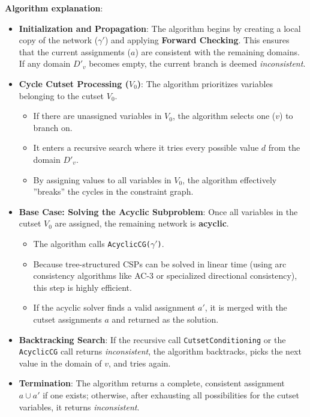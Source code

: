 \documentclass[10pt, letterpaper]{report}
\begin{document}
\noindent\textbf{Algorithm explanation}:
\begin{itemize}[label=\textbullet]
    \item \textbf{Initialization and Propagation}: 
    The algorithm begins by creating a local copy of the network ($\gamma'$) and applying \textbf{Forward Checking}. This ensures that the current assignments ($a$) are consistent with the remaining domains. If any domain $D'_v$ becomes empty, the current branch is deemed \textit{inconsistent}.

    \item \textbf{Cycle Cutset Processing ($V_0$)}:
    The algorithm prioritizes variables belonging to the cutset $V_0$.
    \begin{itemize}
        \item If there are unassigned variables in $V_0$, the algorithm selects one ($v$) to branch on.
        \item It enters a recursive search where it tries every possible value $d$ from the domain $D'_v$. 
        \item By assigning values to all variables in $V_0$, the algorithm effectively ''breaks'' the cycles in the constraint graph.
    \end{itemize}

    \item \textbf{Base Case: Solving the Acyclic Subproblem}:
    Once all variables in the cutset $V_0$ are assigned, the remaining network is \textbf{acyclic}. 
    \begin{itemize}
        \item The algorithm calls \texttt{AcyclicCG($\gamma'$)}.
        \item Because tree-structured CSPs can be solved in linear time (using arc consistency algorithms like AC-3 or specialized directional consistency), this step is highly efficient.
        \item If the acyclic solver finds a valid assignment $a'$, it is merged with the cutset assignments $a$ and returned as the solution.
    \end{itemize}

    \item \textbf{Backtracking Search}:
    If the recursive call \texttt{CutsetConditioning} or the \texttt{AcyclicCG} call returns \textit{inconsistent}, the algorithm backtracks, picks the next value in the domain of $v$, and tries again.

    \item \textbf{Termination}:
    The algorithm returns a complete, consistent assignment $a \cup a'$ if one exists; otherwise, after exhausting all possibilities for the cutset variables, it returns \textit{inconsistent}.
\end{itemize}
\end{document}
